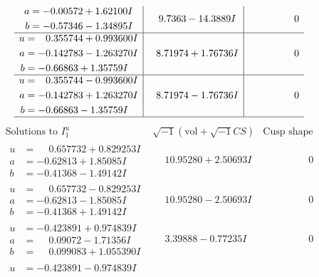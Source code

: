 \documentclass[1p]{elsarticle_modified}
\theoremstyle{definition}
\newcommand{\I}{\sqrt{-1}}
\begin{document}
$$\begin{array}{c|c|c}
\begin{aligned}
a &= -0.00572 + 1.62100 I \\
b &= -0.57346 - 1.34895 I\end{aligned}
 & \phantom{-}9.7363 - 14.3889 I & \phantom{-0.000000 } 0 \\ \hline\begin{aligned}
u &= \phantom{-}0.355744 + 0.993600 I \\
a &= -0.142783 - 1.263270 I \\
b &= -0.66863 + 1.35759 I\end{aligned}
 & \phantom{-}8.71974 + 1.76736 I & \phantom{-0.000000 } 0 \\ \hline\begin{aligned}
u &= \phantom{-}0.355744 - 0.993600 I \\
a &= -0.142783 + 1.263270 I \\
b &= -0.66863 - 1.35759 I\end{aligned}
 & \phantom{-}8.71974 - 1.76736 I & \phantom{-0.000000 } 0\\
 \hline 
 \end{array}$$\newpage$$\begin{array}{c|c|c}  
\text{Solutions to }I^u_{1}& \I (\text{vol} + \sqrt{-1}CS) & \text{Cusp shape}\\
 \hline 
\begin{aligned}
u &= \phantom{-}0.657732 + 0.829253 I \\
a &= -0.62813 + 1.85085 I \\
b &= -0.41368 - 1.49142 I\end{aligned}
 & \phantom{-}10.95280 + 2.50693 I & \phantom{-0.000000 } 0 \\ \hline\begin{aligned}
u &= \phantom{-}0.657732 - 0.829253 I \\
a &= -0.62813 - 1.85085 I \\
b &= -0.41368 + 1.49142 I\end{aligned}
 & \phantom{-}10.95280 - 2.50693 I & \phantom{-0.000000 } 0 \\ \hline\begin{aligned}
u &= -0.423891 + 0.974839 I \\
a &= \phantom{-}0.09072 - 1.71356 I \\
b &= \phantom{-}0.099083 + 1.055390 I\end{aligned}
 & \phantom{-}3.39888 - 0.77235 I & \phantom{-0.000000 } 0 \\ \hline\begin{aligned}
u &= -0.423891 - 0.974839 I \\

\end{aligned}
\end{array}$$
\end{document}
